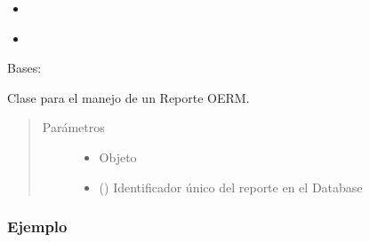 \documentclass[a4paper,12pt,spanish]{sphinxmanual}
\begin{document}
\begin{itemize}
\item {} 
{\hyperref[\detokenize{openerm.Reports:module-openerm.Reports}]{}}

\item {} 
{\hyperref[\detokenize{openerm.Database:module-openerm.Database}]{}}

\end{itemize}



\begin{fulllineitems}
\label{\detokenize{openerm.Report:openerm.Report.Report}}
Bases: 

Clase para el manejo de un Reporte OERM.
\begin{quote}\begin{description}
\item[{Parámetros}] \leavevmode\begin{itemize}
\item {} 
 \textendash{} Objeto {\hyperref[\detokenize{openerm.Database:module-openerm.Database}]{}}

\item {} 
 () \textendash{} Identificador único del reporte en el Database

\end{itemize}

\end{description}\end{quote}
\subsubsection*{Ejemplo}


\end{fulllineitems}
\end{document}
